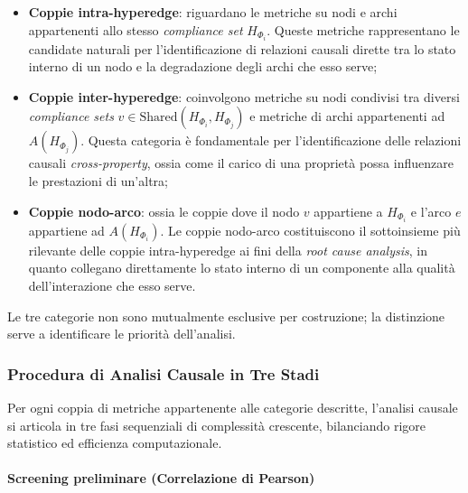 \begin{itemize}
  \item \textbf{Coppie intra-hyperedge}: riguardano le metriche su nodi e archi appartenenti allo
        stesso \textit{compliance set} $H_{\Phi_i}$. Queste metriche rappresentano le candidate
        naturali per l'identificazione di relazioni causali dirette tra lo stato interno di un nodo
        e la degradazione degli archi che esso serve;
  \item \textbf{Coppie inter-hyperedge}: coinvolgono metriche su nodi condivisi tra diversi \textit{compliance sets}
        $v \in \text{Shared}(H_{\Phi_i}, H_{\Phi_j})$ e metriche di archi appartenenti ad
        $A(H_{\Phi_j})$. Questa categoria è fondamentale per l'identificazione delle relazioni
        causali \textit{cross-property}, ossia come il carico di una proprietà possa influenzare
        le prestazioni di un'altra;
  \item \textbf{Coppie nodo-arco}: ossia le coppie dove il nodo $v$ appartiene a $H_{\Phi_i}$ e
        l'arco $e$ appartiene ad $A(H_{\Phi_i})$. Le coppie nodo-arco costituiscono il
        sottoinsieme più rilevante delle coppie intra-hyperedge ai fini della \textit{root cause
        analysis}, in quanto collegano direttamente lo stato interno di un componente alla qualità
        dell'interazione che esso serve.
\end{itemize}

Le tre categorie non sono mutualmente esclusive per costruzione; la distinzione serve a identificare
le priorità dell'analisi.

\subsubsection{Procedura di Analisi Causale in Tre Stadi}
\label{sec:analisi_causale}

Per ogni coppia di metriche appartenente alle categorie descritte, l'analisi causale si articola in
tre fasi sequenziali di complessità crescente, bilanciando rigore statistico ed efficienza
computazionale.

\paragraph{Screening preliminare (Correlazione di Pearson)}

